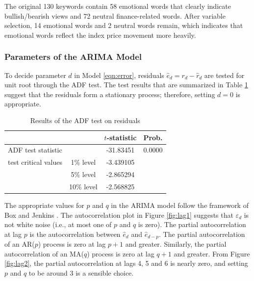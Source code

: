 \documentclass[review,3p,times,12pt,number]{elsarticle}
\begin{document}
The original 130 keywords contain 58 emotional words that clearly indicate bullish/bearish views and 72 neutral finance-related words. After variable selection, 14 emotional words and 2 neutral words remain, which indicates that emotional words reflect the index price movement more heavily.

\subsubsection{Parameters of the ARIMA Model}
To decide parameter $d$ in Model \ref{eqn:error}, residuals $\hat{e}_d = r_d - \hat{r}_d$ are tested for unit root through the ADF test. The test results that are summarized in Table \ref{tab:t3} suggest that the residuals form a stationary process; therefore, setting $d = 0$ is appropriate.

\begin{table}[htbp]
\caption{Results of the ADF test on residuals}
\label{tab:t3}
\center
\begin{tabular} {l c c c}
\hline
& & $t$-statistic & Prob.\\
\hline
\multicolumn{2}{l}{ADF test statistic}	&-31.83451	&0.0000\\
test critical values	&1\% level	&-3.439105 &\\	
	&5\% level	&-2.865294	&\\
	&10\% level	&-2.568825	&\\
\hline
\end{tabular}
\end{table}


The appropriate values for $p$ and $q$ in the ARIMA model follow the framework of Box and Jenkins \cite{Box2015Time}. The autocorrelation plot in Figure \ref{fig:lag1} suggests that $\varepsilon_d$ is not white noise (i.e., at most one of $p$ and $q$ is zero). The partial autocorrelation at lag $p$ is the autocorrelation between $\hat e_d$ and $\hat e_{d-p}$. The partial autocorrelation of an AR($p$) process is zero at lag $p+1$ and greater. Similarly, the partial autocorrelation of an MA($q$) process is zero at lag $q+1$ and greater. From Figure \ref{fig:lag2}, the partial autocorrelation at lags 4, 5 and 6 is nearly zero, and setting $p$ and $q$ to be around 3 is a sensible choice.
\end{document}
